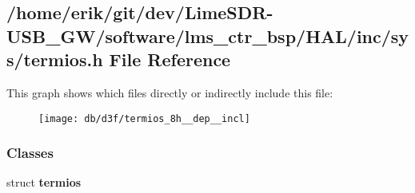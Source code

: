 \subsection{/home/erik/git/dev/\+Lime\+S\+D\+R-\/\+U\+S\+B\+\_\+\+G\+W/software/lms\+\_\+ctr\+\_\+bsp/\+H\+A\+L/inc/sys/termios.h File Reference}
\label{termios_8h}
This graph shows which files directly or indirectly include this file\+:
\nopagebreak
\begin{figure}[H]
\begin{center}
\leavevmode
\texttt{[image: db/d3f/termios\_8h\_\_dep\_\_incl]}
\end{center}
\end{figure}
\subsubsection*{Classes}
\begin{DoxyCompactItemize}
\item 
struct {\bf termios}
\end{DoxyCompactItemize}
